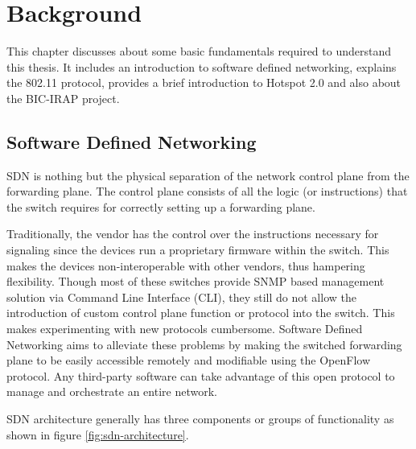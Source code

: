 
\chapter{Background}\label{ch:Background}
\sffamily{}

This chapter discusses about some basic fundamentals required to understand this thesis. It includes an introduction to software defined networking, explains the 802.11 protocol, provides a brief introduction to Hotspot 2.0 and also about the BIC-IRAP project.

\section{Software Defined Networking \cite{SDN}}\label{sec:SDN}

SDN is nothing but the physical separation of the network control plane from the forwarding plane. The control plane consists of all the logic (or instructions) that the switch requires for correctly setting up a forwarding plane.

Traditionally, the vendor has the control over the instructions necessary for signaling since the devices run a proprietary firmware within the switch. This makes the devices non-interoperable with other vendors, thus hampering flexibility. Though most of these switches provide \gls{SNMP} based management solution via Command Line Interface (CLI), they still do not allow the introduction of custom control plane function or protocol into the switch. This makes experimenting with new protocols cumbersome. Software Defined Networking aims to alleviate these problems by making the switched forwarding plane to be easily accessible remotely and modifiable using the OpenFlow protocol. Any third-party software can take advantage of this open protocol to manage and orchestrate an entire network.

SDN architecture generally has three components or groups of functionality as shown in figure \ref{fig:sdn-architecture}.

